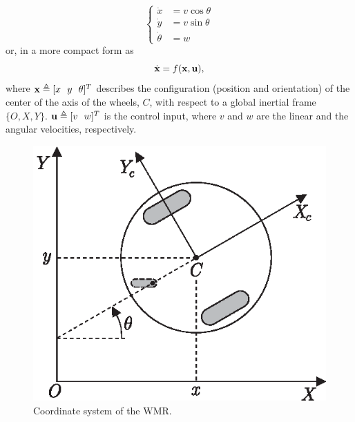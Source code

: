 \documentclass[conference]{IEEEtran} %
\begin{document}
\begin{equation}
\label{eqn:model}
	\left\{
		\begin{aligned}
			\dot x	  &= v\cos\theta \\
			\dot y	  &= v\sin\theta \\
			\dot \theta &= w
		\end{aligned}
	\right.
\end{equation}
or, in a more compact form as
\begin{equation}
\label{eqn:modelshort}
	\dot{\bf x} = f({\bf x},{\bf u}),	
\end{equation}
\noindent where ${\bf x}\triangleq[x~~y~~\theta]^T$ describes the
configuration (position and orientation) of the center of the axis of the
wheels, $C$, with respect to a global inertial frame $\{O,X,Y\}$.
${\bf u}\triangleq[v~~w]^T$ is the control input, where $v$ and $w$ are the
linear and the angular velocities, respectively.

\begin{figure}[b]
	\centering
	\includegraphics[width=0.67\linewidth]{Figures/robot.eps}
	\caption{Coordinate system of the WMR.}
	\label{fig:robot}
\end{figure}
\end{document}
